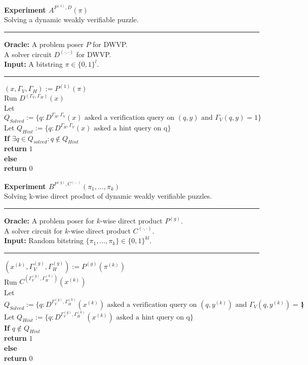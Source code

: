 %
%
\begin{codeblock}
  \textbf{Experiment $A^{P^{(1)}, D}(\pi)$} \\
  Solving a dynamic weakly verifiable puzzle.
  \medskip

  \hrule

  \medskip

  \textbf{Oracle:} A problem poser $P$ for DWVP. \\
                   \IndII A solver circuit $D^{(\cdot,\cdot)}$ for DWVP. \\
  \textbf{Input:}  A bitstring $\pi \in \{0,1\}^{l}$.\\

  \medskip\hrule\medskip

  $(x, \Gamma_V, \Gamma_H) := P^{(1)}(\pi)$ \\
  Run $D^{(\Gamma_V,\Gamma_H)}(x)$ \\
  \IndI Let $Q_{Solved} := \{q: \text{$D^{\Gamma_H, \Gamma_V}(x)$ asked a verification query on $(q,y)$ and $\Gamma_V(q, y) = 1$} \}$\\
  \IndI Let $Q_{Hint} := \{q: \text{$D^{\Gamma_H, \Gamma_V}(x)$ asked a hint query on q} \}$\\
  \textbf{If} $\exists q \in Q_{solved} : q \notin Q_{Hint}$\\
  \IndI \textbf{return} $1$\\
  \textbf{else}\\
  \IndI \textbf{return} $0$\\
\end{codeblock}
%
%
\begin{codeblock}
  \textbf{Experiment $B^{P^{(g)}, C^{(\cdot,\cdot)}}(\pi_1, \dots, \pi_k)$} \\
  Solving k-wise direct product of dynamic weakly verifiable puzzles.
  \medskip

  \hrule

  \medskip

  \textbf{Oracle:} A problem poser for $k$-wise direct product $P^{(g)}$. \\
                   \IndII A solver circuit for $k$-wise direct product $C^{(\cdot,\cdot)}$.\\
  \textbf{Input:} Random bitstring $\{\pi_1, \dots, \pi_k\} \in \{0,1\}^{kl}$.

  \medskip\hrule\medskip

  $(x^{(k)}, \Gamma_V^{(g)}, \Gamma_H^{(g)}) := P^{(g)}(\pi^{(k)})$ \\
  Run $C^{(\Gamma_V^{(g)}, \Gamma_H^{(k)})}(x^{(k)})$\\
  \IndI Let $Q_{Solved} := \{q: \text{$D^{\Gamma_V^{(g)}, \Gamma_H^{(k)}}(x^{(k)})$ asked a verification query on $(q, y^{(k)})$ and $\Gamma_V(q, y^{(k)}) = 1$} \}$\\
  \IndI Let $Q_{Hint} := \{q: \text{$D^{\Gamma_V^{(g)}, \Gamma_H^{(k)}}(x^{(k)})$ asked a hint query on q} \}$\\
  \textbf{If} $q \notin Q_{Hint}$\\
  \IndI \textbf{return} $1$\\
  \textbf{else}\\
  \IndI \textbf{return} $0$\\

\end{codeblock}
